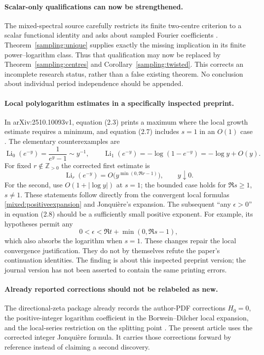 \documentclass[11pt]{article}
\numberwithin{equation}{section}
\theoremstyle{plain}
\theoremstyle{definition}
\theoremstyle{remark}
\DeclareMathOperator{\Li}{Li}
\newcommand{\Z}{\mathbb Z}
\begin{document}
\paragraph{Scalar-only qualifications can now be strengthened.}
The mixed-spectral source carefully restricts its finite two-centre
criterion to a scalar functional identity and asks about sampled
Fourier coefficients \cite{RepoMixed}. Theorem~\ref{sampling:unique}
supplies exactly the missing implication in its finite power--logarithm
class. Thus that qualification may now be replaced by
Theorem~\ref{sampling:centres} and Corollary~\ref{sampling:twisted}.
This corrects an incomplete research status, rather than a false
existing theorem. No conclusion about individual period independence
should be appended.

\paragraph{Local polylogarithm estimates in a specifically inspected preprint.}
In arXiv:2510.10093v1, equation (2.3) prints a maximum where the local
growth estimate requires a minimum, and equation (2.7) includes $s=1$
in an $O(1)$ case \cite{tr3:SS}. The elementary counterexamples are
\[
 \Li_0(e^{-y})=\frac1{e^y-1}\sim y^{-1},\qquad
 \Li_1(e^{-y})=-\log(1-e^{-y})=-\log y+O(y).
\]
For fixed $r\notin\Z_{>0}$ the corrected first estimate is
\[
 \Li_r(e^{-y})=O\bigl(y^{\min(0,\Re r-1)}\bigr),\qquad y\downarrow0.
\]
For the second, use $O(1+|\log y|)$ at $s=1$; the bounded case
holds for $\Re s\ge1$, $s\ne1$. These statements follow directly
from the convergent local formulas \eqref{mixed:positiveexpansion}
and Jonqui\`ere's expansion.
The subsequent ``any $\epsilon>0$'' in equation (2.8) should be a
sufficiently small positive exponent. For example, its hypotheses
permit any
\[
 0<\epsilon<\Re t+\min(0,\Re s-1),
\]
which also absorbs the logarithm when $s=1$.
These changes repair the local convergence justification. They do not
by themselves refute the paper's continuation identities. The finding
is about this inspected preprint version; the journal version has not
been asserted to contain the same printing errors.

\paragraph{Already reported corrections should not be relabeled as new.}
The directional-zeta package already records the author-PDF corrections
$H_0=0$, the positive-integer logarithm coefficient in the
Borwein--Dilcher local expansion, and the local-series restriction
on the splitting point \cite{RepoDirectional}. The present article
uses the corrected integer Jonqui\`ere formula. It carries those
corrections forward by reference instead of claiming a second discovery.
\end{document}
